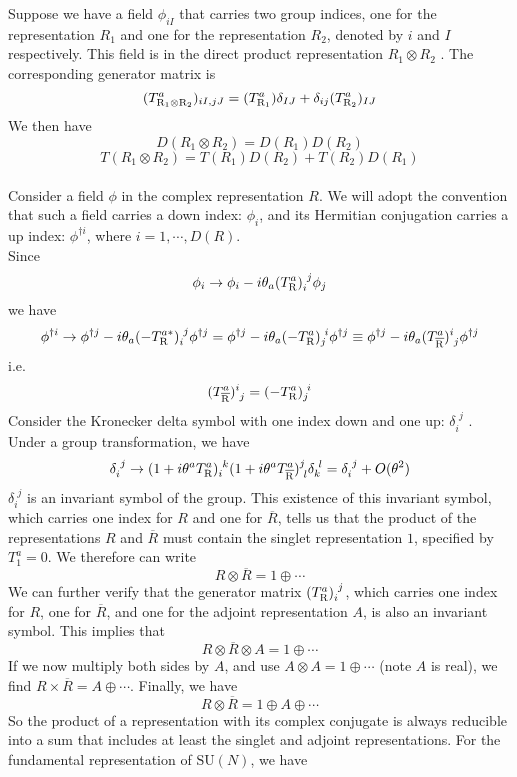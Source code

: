 \noindent
Suppose we have a field $\phi_{iI}$ that carries two group indices, one for the representation $R_1$ and one for the representation $R_2$, denoted by $i$ and $I$ respectively.
This field is in the direct product representation $R_1 \otimes R_2$ . The corresponding generator matrix is
\[(T^a_{\rm R_1 \otimes R_2})_{iI,jJ} = (T^a_{\rm R_1})\delta_{IJ} + \delta_{ij}(T^a_{\rm R_2})_{IJ}\]
We then have
\[D(R_1\otimes R_2) = D(R_1)D(R_2)\]
\[T(R_1\otimes R_2) = T(R_1)D(R_2) + T(R_2)D(R_1)\]
\\
Consider a field $\phi$ in the complex representation $R$. We will adopt the convention that such a field carries a
down index: $\phi_i$, and its Hermitian conjugation carries a up index: $\phi^{\dagger i}$, where $i = 1,\cdots,D(R)$.
\\ 
Since
\[\phi_i \to \phi_i - i\theta_a (T^a_{\rm R})_{i}^{\phantom{i}j}\phi_j \]
we have
\[\phi^{\dagger i} \to \phi^{\dagger j} - i\theta_a (-T^{a*}_{\rm R})_{i}^{\phantom{i}j}\phi^{\dagger j} = \phi^{\dagger j} - i\theta_a (-T^{a}_{\rm R})_{j}^{\phantom{i}i}\phi^{\dagger j} \equiv \phi^{\dagger j} - i\theta_a (T^{a}_{\rm \overline{R}})^{i}_{\phantom{i}j}\phi^{\dagger j}\]
i.e.
\[(T^{a}_{\rm \overline{R}})^{i}_{\phantom{i}j} = (-T^{a}_{\rm R})_{j}^{\phantom{i}i}\]
Consider the Kronecker delta symbol with one index down and one up: $\delta_i^{\phantom{i}j}$ . Under a group transformation, we have
\[\delta_i^{\phantom{i}j} \to (1+i\theta^a T^a_{\rm R})_{i}^{\phantom{i}k} (1+i\theta^a T^a_{\rm \overline{R}})^{j}_{\phantom{i}l}\delta_k^{\phantom{i}l} = \delta_i^{\phantom{i}j} + O(\theta^2)\]
$\delta_i^{\phantom{i}j}$ is an invariant symbol of the group. This existence of this invariant symbol, which carries one index for $R$ and one for $\overline{R}$, tells us that the product of the representations $R$ and $\overline{R}$ must contain the singlet representation $1$, specified by $T_1^a = 0$. We therefore can write
\[R \otimes \overline{R} = 1 \oplus \cdots\]
We can further verify that the generator matrix $(T_{\rm R}^a)_i^{\phantom{i}j}$, which carries one index for $R$, one for $\overline{R}$, and one for the adjoint representation $A$, is also an invariant symbol.
This implies that
\[R \otimes \overline{R} \otimes A = 1 \oplus \cdots\]
If we now multiply both sides by $A$, and use $A \otimes A = 1 \oplus \cdots$ (note $A$ is real), we find $R \times \overline{R} = A \oplus \cdots$. Finally, we have
\[R \otimes \overline{R} = 1 \oplus A \oplus \cdots \]
So the product of a representation with its complex conjugate is always reducible into a sum that includes at least the singlet and adjoint representations. For the fundamental representation of $\mathrm{SU}(N)$, we have
